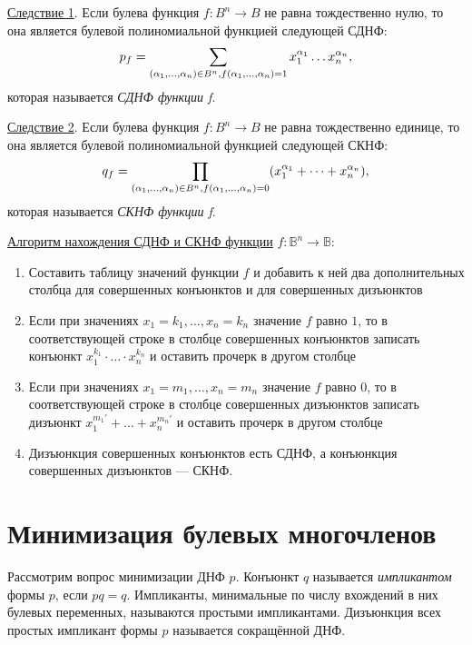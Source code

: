 \underline{Следствие 1}. Если булева функция $f:B^n \to B$ не равна тождественно нулю, то она является булевой полиномиальной функцией следующей СДНФ:
\begin{equation*}
    p_f = \sum_{(\alpha_1,\dots,\alpha_n) \in B^n, \\ f(\alpha_1, \dots, \alpha_n) = 1} x_1^{\alpha_1} \dots x_n^{\alpha_n},
\end{equation*}
которая называется \textit{СДНФ функции f}.

\underline{Следствие 2}. Если булева функция $f: B^n \to B$ не равна тождественно единице, то она является булевой полиномиальной функцией следующей СКНФ:
\begin{equation*}
    q_f = \prod_{(\alpha_1,\dots,\alpha_n) \in B^n, \\ f(\alpha_1, \dots, \alpha_n) = 0} (x_1^{\alpha_1} + \dots + x_n^{\alpha_n}),
\end{equation*}
которая называется \textit{СКНФ функции f}.

\underline{Алгоритм нахождения СДНФ и СКНФ функции} $f: \mathbb{B}^n \to \mathbb{B}$:
\begin{enumerate}
    \item Составить таблицу значений функции $f$ и добавить к ней два дополнительных столбца для совершенных конъюнктов и для совершенных дизъюнктов
    \item Если при значениях $x_1 = k_1,\dots,x_n=k_n$ значение $f$ равно $1$, то в соответствующей строке в столбце  совершенных конъюнктов записать конъюнкт $x^{k_1}_1\cdot\dots\cdot x^{k_n}_n$ и оставить прочерк в другом столбце
    \item Если при значениях $x_1 = m_1,\dots,x_n=m_n$ значение $f$ равно $0$, то в соответствующей строке в столбце  совершенных дизъюнктов записать дизъюнкт $x^{m_1'}_1+\dots+x^{m_n'}_n$ и оставить прочерк в другом столбце
    \item Дизъюнкция совершенных конъюнктов есть СДНФ, а конъюнкция совершенных дизъюнктов --- СКНФ.
\end{enumerate}

\section{Минимизация булевых многочленов}
Рассмотрим вопрос минимизации ДНФ $p$. Конъюнкт $q$ называется \textit{импликантом} формы $p$, если $pq = q$. Импликанты, минимальные по числу вхождений в них булевых переменных, называются $\textit{простыми импликантами}$. Дизъюнкция всех простых импликант формы $p$ называется $\textit{сокращённой ДНФ}$.

